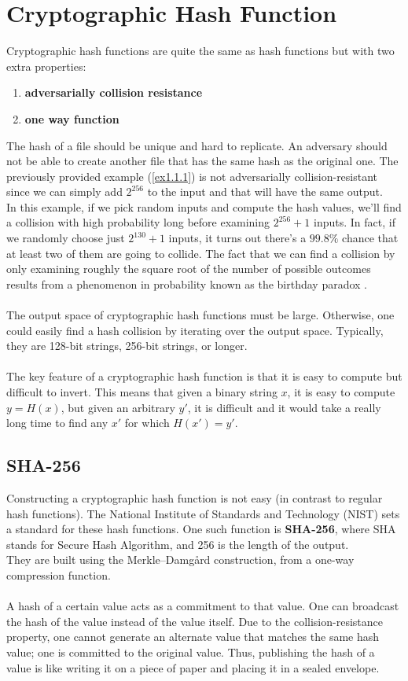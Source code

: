 \section{Cryptographic Hash Function}
Cryptographic hash functions are quite the same as hash functions but with two extra properties:
\begin{enumerate}
    \item \textbf{adversarially collision resistance}
    \item \textbf{one way function}
\end{enumerate} 
The hash of a file should be unique and hard to replicate. An adversary should not be able to create another file that has the same hash as the original one. The previously provided example (\ref{ex1.1.1}) is not adversarially collision-resistant since we can simply add $2^{256}$ to the input and that will have the same output.\\
In this example, if we pick random inputs and compute the hash values, we’ll find a collision with high probability long before examining $2^{256} + 1$ inputs. In fact, if we randomly choose just $2^{130} + 1$ inputs, it turns out there’s a $99.8\%$ chance that at least two of them are going to collide. The fact that we can find a collision by only examining roughly the square root of the number of possible outcomes results from a phenomenon in probability known as the birthday
paradox .\\\\
The output space of cryptographic hash functions must be large. Otherwise, one could easily find a hash collision by iterating over the output space. Typically, they are 128-bit strings, 256-bit strings, or longer.\\\\
The key feature of a cryptographic hash function is that it is easy to compute but difficult to invert. This means that given a binary string $x$, it is easy to compute $y = H(x)$, but given an arbitrary $y'$, it is difficult and it would take a really long time to find any $x'$ for which $H(x') = y'$.
\subsection*    {SHA-256}
Constructing a cryptographic hash function is not easy (in contrast to regular hash functions). The National Institute of Standards and Technology (NIST) sets a standard for these hash functions. One such function is \textbf{SHA-256}, where SHA stands for Secure Hash Algorithm, and 256 is the length of the output. \\
They are built using the Merkle–Damgård construction, from a one-way compression function.\\\\
A hash of a certain value acts as a commitment to that value. One can broadcast the hash of the value instead of the value itself. Due to the collision-resistance property, one cannot generate an alternate value that matches the same hash
value; one is committed to the original value. Thus, publishing the hash of a value is like writing it on a piece of paper and placing it in a sealed envelope.
